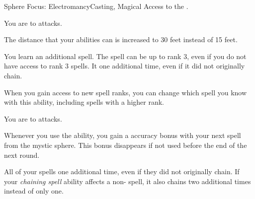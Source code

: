   \begin{magicalfeat}{Sphere Focus: Electromancy}{Casting, Magical}
    \featpre Access to the  .

     You are  to \atElectricity attacks.

     The distance that your abilities can  is increased to 30 feet instead of 15 feet.

     You learn an additional  spell.
    The spell can be up to rank 3, even if you do not have access to rank 3 spells.
    It  one additional time, even if it did not originally chain.

    When you gain access to new spell ranks, you can change which spell you know with this ability, including spells with a higher rank.

     You are  to \atElectricity attacks.

     Whenever you use the  ability, you gain a  accuracy bonus with your next spell from the  mystic sphere.
    This bonus disappears if not used before the end of the next round.

     All of your   spells  one additional time, even if they did not originally chain.
    If your \textit{chaining spell} ability affects a non- spell, it also chains two additional times instead of only one.
  \end{magicalfeat}

